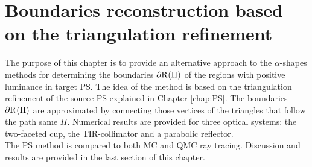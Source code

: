 \chapter{Boundaries reconstruction based on the triangulation refinement}\label{chap:triangulation}
The purpose of this chapter is to provide an alternative approach to the $\alpha$-shapes methods for determining the boundaries $\partial \mbox{$\textup{R}_{\textit{}}$}(\Pi)$ of the regions with positive luminance in target PS. The idea of the method is based on the triangulation refinement of the source PS explained in Chapter \ref{chap:PS}. The boundaries $\partial \mbox{$\textup{R}_{\textit{}}$}(\Pi)$ are approximated by connecting those vertices of the triangles that follow the path same $\Pi$. Numerical results are provided for three optical systems: the two-faceted cup, the TIR-collimator and a parabolic reflector.\\ \indent The PS method is compared to both MC and QMC ray tracing. Discussion and results are provided in the last section of this chapter.
